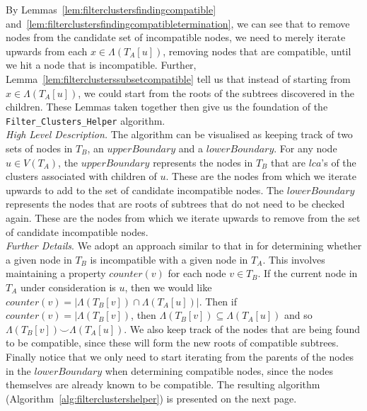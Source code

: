 \documentclass{article}
\newcommand{\compatible}{\smile}
\newcommand{\leafset}{\Lambda}
\begin{document}
    By Lemmas~\ref{lem:filterclustersfindingcompatible} and~\ref{lem:filterclustersfindingcompatibletermination}, we can see that to remove nodes from the candidate set of incompatible nodes, we need to merely iterate upwards from each $x \in \leafset(T_A[u])$, removing nodes that are compatible, until we hit a node that is incompatible. Further, Lemma~\ref{lem:filterclusterssubsetcompatible} tell us that instead of starting from $x \in \leafset(T_A[u])$, we could start from the roots of the subtrees discovered in the children. These Lemmas taken together then give us the foundation of the \texttt{Filter\_Clusters\_Helper} algorithm.\\

    \textit{High Level Description.} The algorithm can be visualised as keeping track of two sets of nodes in $T_B$, an $upperBoundary$ and a $lowerBoundary$. For any node $u \in V(T_A)$, the $upperBoundary$ represents the nodes in $T_B$ that are $lca$'s of the clusters associated with children of $u$. These are the nodes from which we iterate upwards to add to the set of candidate incompatible nodes. The $lowerBoundary$ represents the nodes that are roots of subtrees that do not need to be checked again. These are the nodes from which we iterate upwards to remove from the set of candidate incompatible nodes.\\

    \textit{Further Details}. We adopt an approach similar to that in \cite{jansson2018algorithms} for determining whether a given node in $T_B$ is incompatible with a given node in $T_A$. This involves maintaining a property $counter(v)$ for each node $v \in T_B$. If the current node in $T_A$ under consideration is $u$, then we would like $counter(v) = |\leafset(T_B[v]) \cap \leafset(T_A[u])|$. Then if $counter(v) = |\leafset(T_B[v])$, then $\leafset(T_B[v]) \subseteq \leafset(T_A[u])$ and so $\leafset(T_B[v]) \compatible \leafset(T_A[u])$. We also keep track of the nodes that are being found to be compatible, since these will form the new roots of compatible subtrees. Finally notice that we only need to start iterating from the parents of the nodes in the $lowerBoundary$ when determining compatible nodes, since the nodes themselves are already known to be compatible. The resulting algorithm (Algorithm~\ref{alg:filterclustershelper}) is presented on the next page.\\
\end{document}
